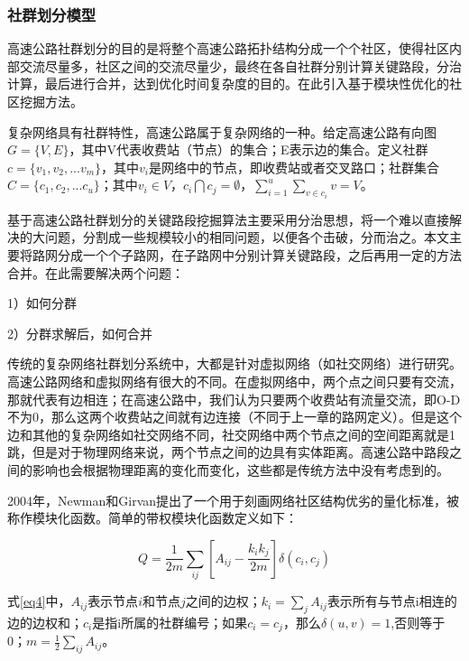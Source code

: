 			\subsubsection{社群划分模型}
				高速公路社群划分的目的是将整个高速公路拓扑结构分成一个个社区，使得社区内部交流尽量多，社区之间的交流尽量少，最终在各自社群分别计算关键路段，分治计算，最后进行合并，达到优化时间复杂度的目的。在此引入基于模块性优化的社区挖掘方法。

				复杂网络具有社群特性，高速公路属于复杂网络的一种。给定高速公路有向图$G=\{V,E\}$，其中V代表收费站（节点）的集合；E表示边的集合。定义社群$c=\{v_1,v_2,...v_m\}$，其中$v_i$是网络中的节点，即收费站或者交叉路口；社群集合$C=\{c_1,c_2,...c_u\}$；其中$v_i \in V$，${c_i}\bigcap {{c_j}}  = \emptyset$，$\sum\limits_{i = 1}^u {\sum\limits_{v \in {c_i}} v  = V}$。

				基于高速公路社群划分的关键路段挖掘算法主要采用分治思想，将一个难以直接解决的大问题，分割成一些规模较小的相同问题，以便各个击破，分而治之。本文主要将路网分成一个个子路网，在子路网中分别计算关键路段，之后再用一定的方法合并。在此需要解决两个问题：

					1）如何分群

					2）分群求解后，如何合并

				传统的复杂网络社群划分系统中，大都是针对虚拟网络（如社交网络）进行研究。高速公路网络和虚拟网络有很大的不同。在虚拟网络中，两个点之间只要有交流，那就代表有边相连；在高速公路中，我们认为只要两个收费站有流量交流，即O-D不为0，那么这两个收费站之间就有边连接（不同于上一章的路网定义）。但是这个边和其他的复杂网络如社交网络不同，社交网络中两个节点之间的空间距离就是1跳，但是对于物理网络来说，两个节点之间的边具有实体距离。高速公路中路段之间的影响也会根据物理距离的变化而变化，这些都是传统方法中没有考虑到的。

				2004年，Newman和Girvan\parencite{NewmanBasic}提出了一个用于刻画网络社区结构优劣的量化标准，被称作模块化函数。简单的带权模块化函数定义如下：

				\begin{equation}
				Q = \frac{1}{{2m}}\sum\limits_{ij} {[{A_{ij}} - \frac{{{k_i}{k_j}}}{{2m}}]\delta ({c_i},{c_j})}
				\label{eq4}
				\end{equation}

				式\ref{eq4}中，$A_{ij}$表示节点$i$和节点$j$之间的边权；$k_i=\sum\limits_{j} {A_{ij}}$表示所有与节点i相连的边的边权和；$c_i$是指i所属的社群编号；如果$c_i=c_j$，那么$\delta (u,v)=1$,否则等于0；$m=\frac{1}{{2}}\sum\limits_{ij} {A_{ij}}$。

